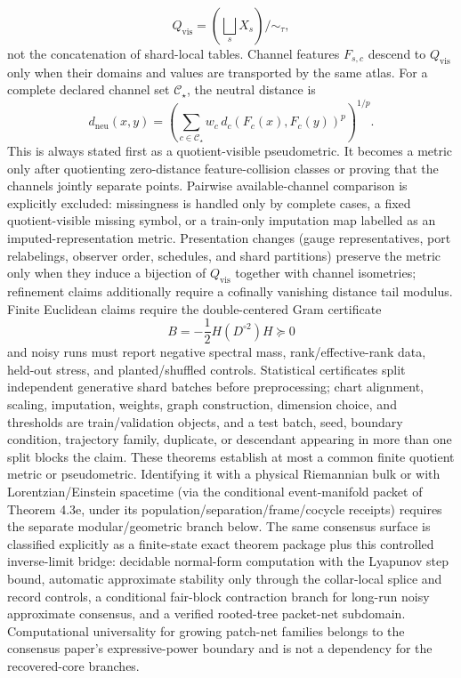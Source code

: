 \[
Q_{\mathrm{vis}}=\left(\bigsqcup_s X_s\right)/\!\sim_\tau ,
\]
not the concatenation of shard-local tables. Channel features \(F_{s,c}\) descend to
\(Q_{\mathrm{vis}}\) only when their domains and values are transported by the same atlas. For a
complete declared channel set \(\mathcal C_\star\), the neutral distance is
\[
d_{\mathrm{neu}}(x,y)=
\left(\sum_{c\in\mathcal C_\star}w_c\,d_c(F_c(x),F_c(y))^p\right)^{1/p}.
\]
This is always stated first as a quotient-visible pseudometric. It becomes a metric only after
quotienting zero-distance feature-collision classes or proving that the channels jointly
separate points. Pairwise available-channel comparison is explicitly excluded: missingness is
handled only by complete cases, a fixed quotient-visible missing symbol, or a train-only
imputation map labelled as an imputed-representation metric. Presentation changes (gauge
representatives, port relabelings, observer order, schedules, and shard partitions) preserve the
metric only when they induce a bijection of \(Q_{\mathrm{vis}}\) together with channel
isometries; refinement claims additionally require a cofinally vanishing distance tail modulus.
Finite Euclidean claims require the double-centered Gram certificate
\[
B=-\frac12H(D^{\circ2})H\succeq0
\]
and noisy runs must report negative spectral mass, rank/effective-rank data, held-out stress, and
planted/shuffled controls. Statistical certificates split independent generative shard batches
before preprocessing; chart alignment, scaling, imputation, weights, graph construction,
dimension choice, and thresholds are train/validation objects, and a test batch, seed, boundary
condition, trajectory family, duplicate, or descendant appearing in more than one split blocks
the claim. These theorems establish at most a common finite quotient metric or pseudometric.
Identifying it with a physical Riemannian bulk or with Lorentzian/Einstein spacetime (via the conditional event-manifold packet of Theorem 4.3e, under its population/separation/frame/cocycle receipts) requires the
separate modular/geometric branch below. The same
consensus surface is classified explicitly as a
finite-state exact theorem package plus this controlled inverse-limit bridge: decidable
normal-form computation with the Lyapunov step bound, automatic approximate stability only
through the collar-local splice and record controls, a conditional fair-block contraction branch
for long-run noisy approximate consensus, and a verified rooted-tree packet-net subdomain.
Computational universality for growing patch-net families belongs to the consensus paper's
expressive-power boundary and is not a dependency for the recovered-core branches.


